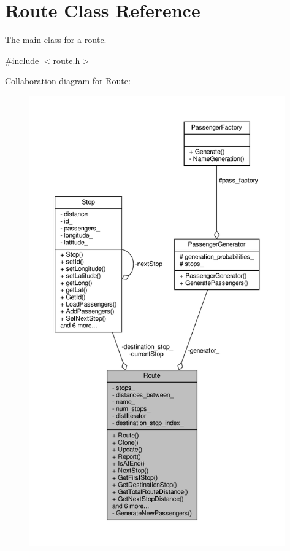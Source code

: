 \hypertarget{classRoute}{}\section{Route Class Reference}
\label{classRoute}


The main class for a route.  




{\ttfamily \#include $<$route.\+h$>$}



Collaboration diagram for Route\+:\nopagebreak
\begin{figure}[H]
\begin{center}
\leavevmode
\includegraphics[height=550pt]{classRoute__coll__graph}
\end{center}
\end{figure}
